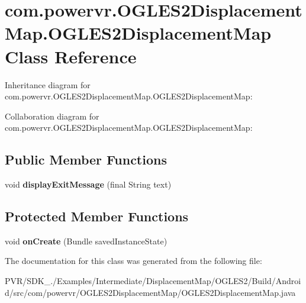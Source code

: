 \hypertarget{classcom_1_1powervr_1_1_o_g_l_e_s2_displacement_map_1_1_o_g_l_e_s2_displacement_map}{\section{com.\+powervr.\+O\+G\+L\+E\+S2\+Displacement\+Map.\+O\+G\+L\+E\+S2\+Displacement\+Map Class Reference}
\label{classcom_1_1powervr_1_1_o_g_l_e_s2_displacement_map_1_1_o_g_l_e_s2_displacement_map}
}


Inheritance diagram for com.\+powervr.\+O\+G\+L\+E\+S2\+Displacement\+Map.\+O\+G\+L\+E\+S2\+Displacement\+Map\+:


Collaboration diagram for com.\+powervr.\+O\+G\+L\+E\+S2\+Displacement\+Map.\+O\+G\+L\+E\+S2\+Displacement\+Map\+:
\subsection*{Public Member Functions}
\begin{DoxyCompactItemize}
\item 
\hypertarget{classcom_1_1powervr_1_1_o_g_l_e_s2_displacement_map_1_1_o_g_l_e_s2_displacement_map_ae7d501741e7dcf19d89596b391b9126c}{void {\bfseries display\+Exit\+Message} (final String text)}\label{classcom_1_1powervr_1_1_o_g_l_e_s2_displacement_map_1_1_o_g_l_e_s2_displacement_map_ae7d501741e7dcf19d89596b391b9126c}

\end{DoxyCompactItemize}
\subsection*{Protected Member Functions}
\begin{DoxyCompactItemize}
\item 
\hypertarget{classcom_1_1powervr_1_1_o_g_l_e_s2_displacement_map_1_1_o_g_l_e_s2_displacement_map_ac3b0dfdf427611f53e334aca8b26c6ec}{void {\bfseries on\+Create} (Bundle saved\+Instance\+State)}\label{classcom_1_1powervr_1_1_o_g_l_e_s2_displacement_map_1_1_o_g_l_e_s2_displacement_map_ac3b0dfdf427611f53e334aca8b26c6ec}

\end{DoxyCompactItemize}


The documentation for this class was generated from the following file\+:\begin{DoxyCompactItemize}
\item 
P\+V\+R/\+S\+D\+K\+\_./\+Examples/\+Intermediate/\+Displacement\+Map/\+O\+G\+L\+E\+S2/\+Build/\+Android/src/com/powervr/\+O\+G\+L\+E\+S2\+Displacement\+Map/O\+G\+L\+E\+S2\+Displacement\+Map.\+java\end{DoxyCompactItemize}
